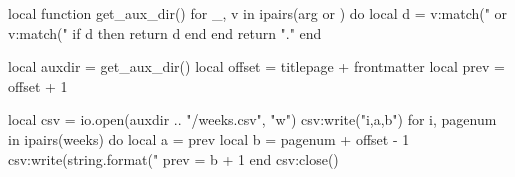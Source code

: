 \documentclass{./guidednotes/guidednotes}
\begin{document}
% 
% 
\backmatter{}

% 
% 
\begin{luacode*}
local function get_aux_dir()
  for _, v in ipairs(arg or {}) do
    local d = v:match("%
               or v:match("%
    if d then return d end
  end
  return "."
end

local auxdir = get_aux_dir()
local offset = titlepage + frontmatter
local prev   = offset + 1

local csv = io.open(auxdir .. "/weeks.csv", "w")
csv:write("i,a,b\n")
for i, pagenum in ipairs(weeks) do
  local a = prev
  local b = pagenum + offset - 1
  csv:write(string.format("%
  prev = b + 1
end
csv:close()
\end{luacode*}
\end{document}
